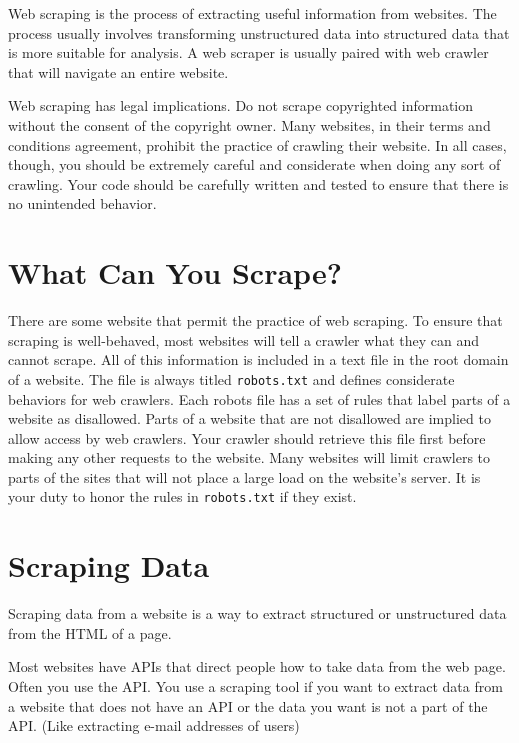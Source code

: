 
Web scraping is the process of extracting useful information from websites.
The process usually involves transforming unstructured data into structured data that is more 
suitable for analysis.
A web scraper is usually paired with web crawler that will navigate an entire website.

\begin{warn}
Web scraping has legal implications.
Do not scrape copyrighted information without the consent of the copyright owner.
Many websites, in their terms and conditions agreement, prohibit the practice of crawling their 
website.
In all cases, though, you should be extremely careful and considerate when doing any sort of 
crawling.
Your code should be carefully written and tested to ensure that there is no unintended behavior.
\end{warn}

\section*{What Can You Scrape?}
There are some website that permit the practice of web scraping.
To ensure that scraping is well-behaved, most websites will tell a crawler what they can and cannot 
scrape.
All of this information is included in a text file in the root domain of a website.
The file is always titled \texttt{robots.txt} and defines considerate behaviors for web crawlers.
Each robots file has a set of rules that label parts of a website as disallowed.
Parts of a website that are not disallowed are implied to allow access by web crawlers.
Your crawler should retrieve this file first before making any other requests to the website.
Many websites will limit crawlers to parts of the sites that will not place a large load on the 
website's server.
It is your duty to honor the rules in \texttt{robots.txt} if they exist.

\section*{Scraping Data}
Scraping data from a website is a way to extract structured or unstructured data from the HTML of a page.

Most websites have APIs that direct people how to take data from the web page. 
Often you use the API. 
You use a scraping tool if you want to extract data from a website that does not have an API or the data you want is not a part of the API.
 (Like extracting e-mail addresses of users)

